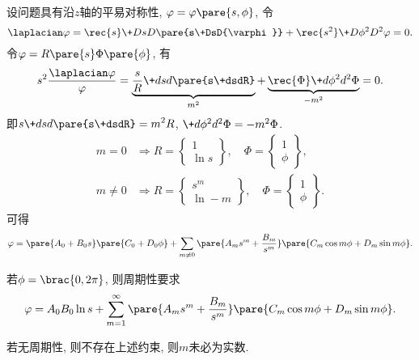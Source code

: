 \documentclass[hidelinks]{ctexart}
\begin{document}
设问题具有沿$z$轴的平易对称性, $\varphi = \varphi\pare{s,\phi}$, 令
\[ \laplacian \varphi = \rec{s}\+DsD{}\pare{s\+DsD{\varphi}} + \rec{s^2}\+D{\phi^2}D{^2\varphi} = 0. \]
令$\varphi = R\pare{s}\Phi\pare{\phi}$, 有
\[ s^2 \frac{\laplacian \varphi}{\varphi} = \underbrace{\frac{s}{R}\+dsd{}\pare{s\+dsdR}}_{m^2} + \underbrace{\rec{\Phi}\+d{\phi^2}d{^2\Phi}}_{-m^2} = 0. \]
即$\displaystyle s\+dsd{}\pare{s\+dsdR} = m^2 R$, $\+d{\phi^2}d{^2\Phi} = -m^2\Phi$.
\begin{align*}
    m=0 &\Rightarrow R = \left\{\begin{aligned}
        1 \\ \ln s
    \end{aligned} \right\}, \quad \Phi = \left\{\begin{aligned}
        1 \\ \phi
    \end{aligned} \right\}, \\
    m\neq 0  &\Rightarrow R = \left\{\begin{aligned}
        s^m \\ \ln -m
    \end{aligned} \right\}, \quad \Phi = \left\{\begin{aligned}
        1 \\ \phi
    \end{aligned} \right\}.
\end{align*}
可得
\[ \varphi = \pare{A_0 + B_0 s}\pare{C_0 + D_0\phi} + \sum_{m\neq 0} \pare{A_m s^m + \frac{B_m}{s^m}} \pare{C_m \cos m\phi + D_m \sin m\phi}. \]
\begin{cenum}
    \item 若$\phi = \brac{0,2\pi}$, 则周期性要求
    \[ \varphi = A_0 B_0\ln s + \sum_{m=1}^\infty\pare{A_ms^m + \frac{B_m}{s^m}}\pare{C_m \cos m\phi + D_m \sin m\phi}. \]
    \item 若无周期性, 则不存在上述约束, 则$m$未必为实数.
\end{cenum}
\begin{figure}[ht]
    \centering
    \caption{}
    \label{fig:圆柱laplacian}
\end{figure}
\end{document}
